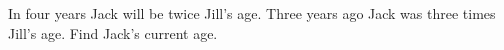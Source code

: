 In four years Jack will be twice Jill's age. Three years ago Jack was three times Jill's age. Find Jack's current age.
